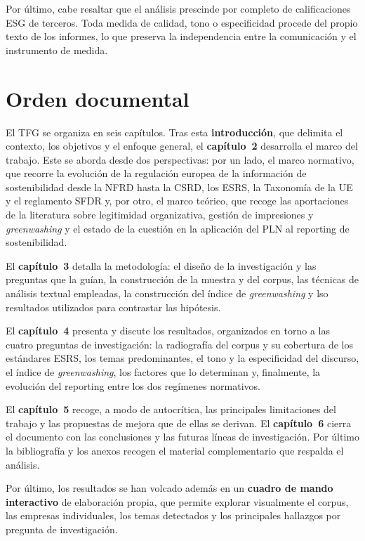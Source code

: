Por último, cabe resaltar que el análisis prescinde por completo de
calificaciones ESG de terceros. Toda medida de calidad, tono o especificidad procede del
propio texto de los informes, lo que preserva la independencia entre la comunicación y el instrumento de medida.

\section{Orden documental}
\label{sec:orden}

El TFG se organiza en seis capítulos. Tras esta \textbf{introducción}, que
delimita el contexto, los objetivos y el enfoque general, el \textbf{capítulo~2} desarrolla el
marco del trabajo. Este se aborda desde dos perspectivas: por un lado, el marco
normativo, que recorre la evolución de la regulación europea de la información de
sostenibilidad desde la NFRD hasta la CSRD, los ESRS, la Taxonomía de la UE y el reglamento
SFDR y, por otro, el marco teórico, que recoge las aportaciones de la literatura sobre
legitimidad organizativa, gestión de impresiones y \textit{greenwashing} y el estado
de la cuestión en la aplicación del PLN al reporting de sostenibilidad.

El \textbf{capítulo~3} detalla la metodología: el diseño de la investigación y las preguntas
que la guían, la construcción de la muestra y del corpus, las técnicas de análisis textual
empleadas, la construcción del índice de \textit{greenwashing} y lso resultados utilizados para contrastar las hipótesis.

El \textbf{capítulo~4} presenta y discute los resultados, organizados en torno a las cuatro
preguntas de investigación: la radiografía del corpus y su cobertura de los estándares ESRS,
los temas predominantes, el tono y la especificidad del discurso, el índice de
\textit{greenwashing}, los factores que lo determinan y, finalmente, la evolución del
reporting entre los dos regímenes normativos.

El \textbf{capítulo~5} recoge, a modo de autocrítica, las principales limitaciones del trabajo
y las propuestas de mejora que de ellas se derivan. El \textbf{capítulo~6} cierra el documento
con las conclusiones y las futuras líneas de investigación. Por último la bibliografía y los anexos
recogen el material complementario que respalda el análisis.

Por último, los resultados se han volcado además en un
\textbf{cuadro de mando interactivo} de elaboración propia, que permite explorar visualmente
el corpus, las empresas individuales, los temas detectados y los principales hallazgos por
pregunta de investigación.
